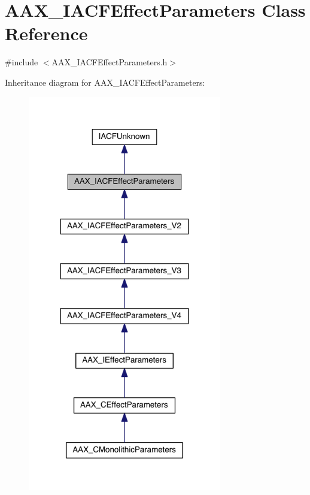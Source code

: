 \hypertarget{a00061}{}\section{A\+A\+X\+\_\+\+I\+A\+C\+F\+Effect\+Parameters Class Reference}
\label{a00061}


{\ttfamily \#include $<$A\+A\+X\+\_\+\+I\+A\+C\+F\+Effect\+Parameters.\+h$>$}



Inheritance diagram for A\+A\+X\+\_\+\+I\+A\+C\+F\+Effect\+Parameters\+:
\nopagebreak
\begin{figure}[H]
\begin{center}
\leavevmode
\includegraphics[width=240pt]{a00526}
\end{center}
\end{figure}


